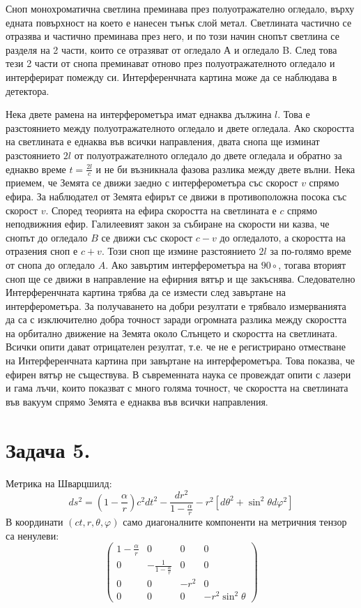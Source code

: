 \documentclass[a4paper,12pt]{article}
\begin{document}
Сноп монохроматична светлина преминава през полуотражателно огледало, 
върху едната повърхност на което е нанесен тънък слой метал. 
Светлината частично се отразява и частично преминава през него, 
и по този начин снопът светлина се разделя на 2 части, които се отразяват от огледало А и огледало B.
След това тези 2 части от снопа преминават отново през полуотражателното огледало и 
интерферират помежду си. Интерференчната картина може да се наблюдава в детектора. 

Нека двете рамена на интерферометъра имат еднаква дължина $l$. Това е разстоянието между 
полуотражателното огледало и двете огледала.
Ако скоростта на светлината е еднаква във всички направления, двата снопа ще изминат 
разстоянието $2l$ от полуотражателното огледало до двете огледала и обратно за еднакво време $t=\frac{2l}{c}$
и не би възникнала фазова разлика между двете вълни.
Нека приемем, че Земята се движи заедно с интерферометъра със скорост $v$ спрямо ефира.
За наблюдател от Земята ефирът се движи в противоположна посока със скорост $v$.
Според теорията на ефира скоростта на светлината е $c$ спрямо неподвижния ефир.
Галилеевият закон за събиране на скорости ни казва, че снопът до огледало $B$ се 
движи със скорост $c-v$ до огледалото, а скоростта на отразения сноп е $c+v$.
Този сноп ще измине разстоянието $2l$ за по-голямо време от снопа до огледало $A$.
Ако завъртим интерферометъра на $90\circ$, тогава вторият сноп ще се движи в направление на 
ефирния вятър и ще закъснява. Следователно Интерференчната картина трябва да се измести след завъртане на 
интерферометъра.
За получаването на добри резултати е трябвало измерванията да са с изключително добра точност
заради огромната разлика между скоростта на орбитално движение на Земята около Слънцето и скоростта на светлината.
Всички опити дават отрицателен резултат, т.е. че не е регистрирано отместване на Интерференчната картина при завъртане 
на интерферометъра. Това показва, че ефирен вятър не съществува.
В съвременната наука се провеждат опити с лазери и гама лъчи, които показват с много голяма точност, че
скоростта на светлината във вакуум спрямо Земята е еднаква във всички направления.
\pagebreak
\section*{Задача 5.}
Метрика на Шварцшилд:
\begin{equation*}
    ds^2 = \left(1 - \frac{\alpha}{r}\right)c^2dt^2 - \frac{dr^2}{1 - \frac{\alpha}{r}} - r^2\left[ d\theta^2 + \sin^2\theta d\varphi^2 \right]
\end{equation*}
В координати $(ct, r, \theta, \varphi)$ само диагоналните
компоненти на метричния тензор са ненулеви: 
\begin{equation*}
\begin{pmatrix}
    1-\frac{\alpha}{r} & 0 & 0 & 0\\
    0 & -\frac{1}{1-\frac{\alpha}{r}} & 0 & 0 \\
    0 & 0 & -r^2 & 0 \\
    0 & 0 & 0 & -r^2\sin^2\theta
\end{pmatrix}
\end{equation*}
\end{document}

